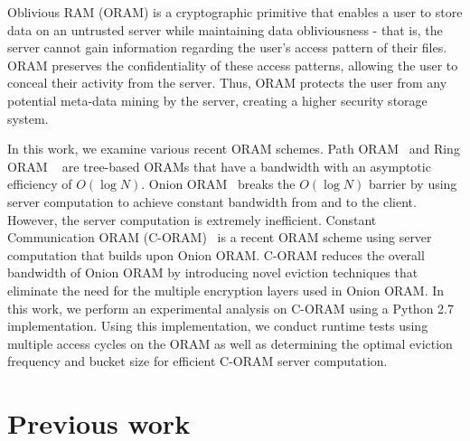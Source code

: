 \documentclass[12pt, oneside]{article}   	%
\begin{document}
Oblivious RAM (ORAM) is a cryptographic primitive that enables a user to store data on an untrusted server while maintaining data obliviousness - that is, the server cannot gain information regarding the user's access pattern of their files. ORAM preserves the confidentiality of these access patterns, allowing the user to conceal their activity from the server. Thus, ORAM protects the user from any potential meta-data mining by the server, creating a higher security storage system.

In this work, we examine various recent ORAM schemes. Path ORAM~\cite{PathORAM} and Ring ORAM ~\cite{RingORAM} are tree-based ORAMs that have a bandwidth with an asymptotic efficiency of $O (\log N )$. Onion ORAM~\cite{OnionORAM} breaks the $O (\log N )$ barrier by using server computation to achieve constant bandwidth from and to the client. However, the server computation is extremely inefficient. Constant Communication ORAM (C-ORAM)~\cite{C-ORAM} is a recent ORAM scheme using server computation that builds upon Onion ORAM. C-ORAM reduces the overall bandwidth of Onion ORAM by introducing novel eviction techniques that eliminate the need for the multiple encryption layers used in Onion ORAM. In this work, we perform an experimental analysis on C-ORAM using a Python 2.7 implementation. Using this implementation, we conduct runtime tests using multiple access cycles on the ORAM as well as determining the optimal eviction frequency and bucket size for efficient C-ORAM server computation.



\section{Previous work}
\end{document}
